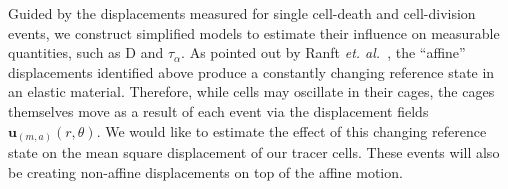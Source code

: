 \documentclass[
reprint
,aps
,amssymb
,amsmath
,superscriptaddress
]{revtex4-1}
\newcommand{\mdc}[1]{{\color{blue}#1}}
\begin{document}
Guided by the displacements measured for single cell-death and cell-division events, we construct simplified models to estimate their influence on measurable quantities, such as $\mathrm{D}$ and $\tau_\alpha$. As pointed out by Ranft \textit{et. al.}~\cite{Ranft2010}, the ``affine'' displacements identified above produce a constantly changing reference state in an elastic material. Therefore, while cells may oscillate in their cages, the cages themselves move as a result of each event via the displacement fields $\mathbf{u}_{(m,a)}(r, \theta)$. We would like to estimate the effect of this changing reference state on the mean square displacement of our tracer cells. %
These events will also be creating non-affine displacements on top of the affine motion. %
\end{document}
